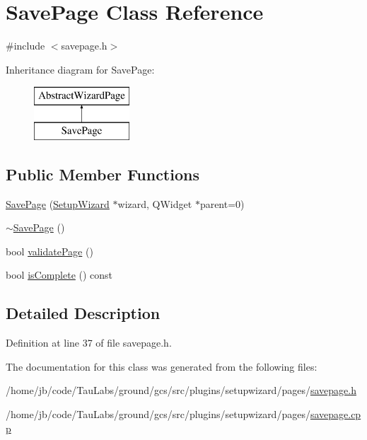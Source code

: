 \hypertarget{class_save_page}{\section{\-Save\-Page \-Class \-Reference}
\label{class_save_page}
}


{\ttfamily \#include $<$savepage.\-h$>$}

\-Inheritance diagram for \-Save\-Page\-:\begin{figure}[H]
\begin{center}
\leavevmode
\includegraphics[height=2.000000cm]{class_save_page}
\end{center}
\end{figure}
\subsection*{\-Public \-Member \-Functions}
\begin{DoxyCompactItemize}
\item 
\hyperlink{group___save_page_gaae1ea2c64ea05a862cb17de8c9bfc49b}{\-Save\-Page} (\hyperlink{class_setup_wizard}{\-Setup\-Wizard} $\ast$wizard, \-Q\-Widget $\ast$parent=0)
\item 
\hyperlink{group___save_page_ga7065bd4228b7cdd30c014d43e02dc527}{$\sim$\-Save\-Page} ()
\item 
bool \hyperlink{group___save_page_gad4c1a470c72a8807dff85b13ea2faf7f}{validate\-Page} ()
\item 
bool \hyperlink{group___save_page_gaa7deb093bcc11a89af590b7b4e32b01c}{is\-Complete} () const 
\end{DoxyCompactItemize}


\subsection{\-Detailed \-Description}


\-Definition at line 37 of file savepage.\-h.



\-The documentation for this class was generated from the following files\-:\begin{DoxyCompactItemize}
\item 
/home/jb/code/\-Tau\-Labs/ground/gcs/src/plugins/setupwizard/pages/\hyperlink{savepage_8h}{savepage.\-h}\item 
/home/jb/code/\-Tau\-Labs/ground/gcs/src/plugins/setupwizard/pages/\hyperlink{savepage_8cpp}{savepage.\-cpp}\end{DoxyCompactItemize}
